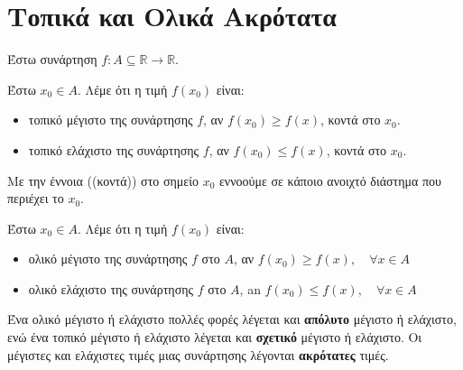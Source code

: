 


\everymath{\displaystyle}
\pagestyle{vangelis}




\chapter*{Τοπικά και Ολικά Ακρότατα}



Έστω συνάρτηση $ f \colon A \subseteq \mathbb{R} \to \mathbb{R} $.

\begin{dfn}
    Έστω $ x_{0} \in A $.  Λέμε ότι η τιμή $ f(x_{0}) $ είναι:
    \begin{itemize}
        \item \textcolor{Col1}{τοπικό μέγιστο}\phantom{a} της συνάρτησης $f$, αν $ f(x_{0}) \geq f(x) $, κοντά στο $ x_{0} $.
        \item \textcolor{Col1}{τοπικό ελάχιστο} της συνάρτησης $f$, αν $ f(x_{0}) \leq f(x) $, κοντά στο $ x_{0} $.
    \end{itemize}
\end{dfn}

Με την έννοια ((κοντά)) στο σημείο $ x_{0} $ εννοούμε σε κάποιο ανοιχτό διάστημα που περιέχει το $ x_{0} $.

\begin{dfn}
    Έστω $ x_{0} \in A $.  Λέμε ότι η τιμή $ f(x_{0}) $ είναι:
    \begin{itemize}
        \item \textcolor{Col1}{ολικό μέγιστο}\phantom{a} της συνάρτησης $f$ στο $ A $, αν $ f(x_{0}) \geq f(x),\quad \forall x \in A $
        \item \textcolor{Col1}{ολικό ελάχιστο} της συνάρτησης $f$ στο $ A $, an $ f(x_{0}) \leq f(x),\quad \forall x
            \in A $
    \end{itemize}
\end{dfn}

Ένα ολικό μέγιστο ή ελάχιστο πολλές φορές λέγεται και \textbf{απόλυτο} μέγιστο ή ελάχιστο, ενώ ένα
τοπικό μέγιστο ή ελάχιστο λέγεται και \textbf{σχετικό} μέγιστο ή ελάχιστο. Οι μέγιστες και
ελάχιστες τιμές μιας συνάρτησης λέγονται \textbf{ακρότατες} τιμές.

